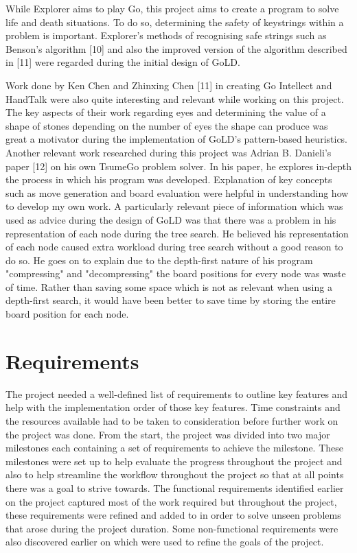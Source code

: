 \documentclass{l4proj}
\begin{document}
While Explorer aims to play Go, this project aims to create a program to solve life and death situations. To do so, determining the safety of keystrings within a problem is important. Explorer's methods of recognising safe strings such as Benson's algorithm [10] and also the improved version of the algorithm described in [11] were regarded during the initial design of GoLD.

Work done by Ken Chen and Zhinxing Chen [11] in creating Go Intellect and HandTalk were also quite interesting and relevant while working on this project. The key aspects of their work regarding eyes and determining the value of a shape of stones depending on the number of eyes the shape can produce was great a motivator during the implementation of GoLD's pattern-based heuristics.
Another relevant work researched during this project was Adrian B. Danieli's paper [12] on his own TsumeGo problem solver. In his paper, he explores in-depth the process in which his program was developed. Explanation of key concepts such as move generation and board evaluation were helpful in understanding how to develop my own work. A particularly relevant piece of information which was used as advice during the design of GoLD was that there was a problem in his representation of each node during the tree search. He believed his representation of each node caused extra workload during tree search without a good reason to do so. He goes on to explain due to the depth-first nature of his program "compressing" and "decompressing" the board positions for every node was waste of time. Rather than saving some space which is not as relevant when using a depth-first search, it would have been better to save time by storing the entire board position for each node.








\chapter{Requirements}

The project needed a well-defined list of requirements to outline key features and help with the implementation order of those key features. Time constraints and the resources available had to be taken to consideration before further work on the project was done. From the start, the project was divided into two major milestones each containing a set of requirements to achieve the milestone. These milestones were set up to help evaluate the progress throughout the project and also to help streamline the workflow throughout the project so that at all points there was a goal to strive towards. The functional requirements identified earlier on the project captured most of the work required but throughout the project, these requirements were refined and added to in order to solve unseen problems that arose during the project duration. Some non-functional requirements were also discovered earlier on which were used to refine the goals of the project.
\end{document}

